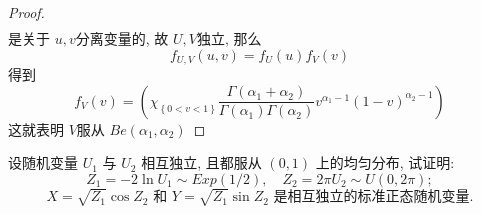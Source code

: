 \documentclass[../main.tex]{subfiles}
\begin{document}
\begin{proof}
\[\begin{aligned}
  \end{aligned}
  \]是关于 \(  u,v  \)分离变量的, 故 \(  U,V  \)独立, 那么 \[
  f_{U,V}\left( u,v \right)= f_{U}\left( u \right)  f_{V}\left( v \right) 
  \] 得到 \[
  f_{V}\left( v \right)= \left( \chi _{\left\{ 0< v< 1 \right\}} \frac{ \Gamma \left( \alpha _1 + \alpha _2  \right)   }{\Gamma \left(  \alpha _1  \right) \Gamma \left( \alpha _2  \right)   }v^{\alpha _1 -1}\left( 1-v \right)^{\alpha _2 -1} \right)  
  \]这就表明 \(  V  \)服从 \(  Be\left( \alpha _1 ,\alpha _2  \right)   \)  
\end{proof}



\begin{exercise}{}{}
设随机变量 $U_1$ 与 $U_2$ 相互独立, 且都服从 $(0,1)$ 上的均匀分布, 试证明:
\begin{equation}
Z_1 = -2\ln U_1 \sim Exp(1/2),\quad Z_2 = 2\pi U_2 \sim U(0,2\pi);
\end{equation}
\begin{equation}
X = \sqrt{Z_1}\cos Z_2 \text{ 和 } Y = \sqrt{Z_1}\sin Z_2 \text{ 是相互独立的标准正态随机变量.}
\end{equation}
\end{exercise}
\end{document}
